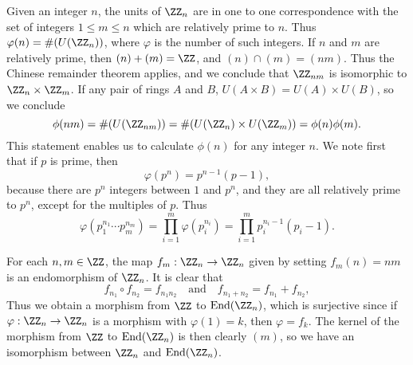 \begin{example}
    Given an integer $n$, the units of $\ZZ_n$ are in one to one correspondence with the set of integers $1 \leq m \leq n$ which are relatively prime to $n$. Thus $\varphi(n) = \#(U(\ZZ_n))$, where $\varphi$ is the number of such integers. If $n$ and $m$ are relatively prime, then $(n) + (m) = \ZZ$, and $(n) \cap (m) = (nm)$. Thus the Chinese remainder theorem applies, and we conclude that $\ZZ_{nm}$ is isomorphic to $\ZZ_n \times \ZZ_m$. If any pair of rings $A$ and $B$, $U(A \times B) = U(A) \times U(B)$, so we conclude
    \[ \phi(nm) = \#(U(\ZZ_{nm})) = \#(U(\ZZ_n) \times U(\ZZ_m)) = \phi(n) \phi(m). \]
    This statement enables us to calculate $\phi(n)$ for any integer $n$. We note first that if $p$ is prime, then
    \[ \varphi(p^n) = p^{n-1}(p-1), \]
    because there are $p^n$ integers between $1$ and $p^n$, and they are all relatively prime to $p^n$, except for the multiples of $p$. Thus
    \[ \varphi(p_1^{n_1} \cdots p_m^{n_m}) = \prod_{i = 1}^m \varphi(p_i^{n_i}) = \prod_{i = 1}^m p_i^{n_i - 1}(p_i - 1). \]
\end{example}

\begin{example}
    For each $n,m \in \ZZ$, the map $f_m: \ZZ_n \to \ZZ_n$ given by setting $f_m(n) = nm$ is an endomorphism of $\ZZ_n$. It is clear that
    \[ f_{n_1} \circ f_{n_2} = f_{n_1n_2} \quad\text{and}\quad f_{n_1 + n_2} = f_{n_1} + f_{n_2}, \]
    Thus we obtain a morphism from $\ZZ$ to $\text{End}(\ZZ_n)$, which is surjective since if $\varphi: \ZZ_n \to \ZZ_n$ is a morphism with $\varphi(1) = k$, then $\varphi = f_k$. The kernel of the morphism from $\ZZ$ to $\text{End}(\ZZ_n)$ is then clearly $(m)$, so we have an isomorphism between $\ZZ_n$ and $\text{End}(\ZZ_n)$.
\end{example}

